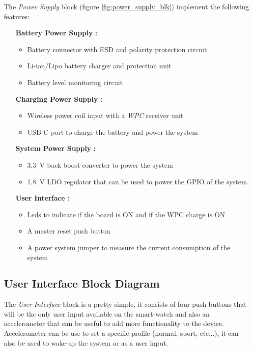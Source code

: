 \documentclass[report.tex]{subfiles}
\begin{document}
\begin{flushleft}
The \textit{Power Supply} block (figure \ref{fig:power_supply_blk}) implement the following features:
\end{flushleft}
\begin{itemize}
\item [\quad\textbf{Battery Power Supply}]\textbf{:}
\begin{itemize}
	\item Battery connector with ESD and polarity protection circuit
	\item Li-ion/Lipo battery charger and protection unit
	\item Battery level monitoring circuit
\end{itemize}
\item [\quad\textbf{Charging Power Supply}]\textbf{:}
\begin{itemize}
	\item Wireless power coil input with a \textit{WPC} receiver unit
	\item USB-C port to charge the battery and power the system
\end{itemize}
\item [\quad\textbf{System Power Supply}]\textbf{:}
\begin{itemize}
	\item \SI{+3.3}{\volt} buck boost converter to power the system
	\item \SI{+1.8}{\volt} LDO regulator that can be used to power the GPIO of the system
\end{itemize}
\item [\quad\textbf{User Interface}]\textbf{:}
\begin{itemize}
	\item Leds to indicate if the board is ON and if the WPC charge is ON
	\item A master reset push button
	\item A power system jumper to measure the current consumption of the system
\end{itemize}
\end{itemize}

\subsection{User Interface Block Diagram} \label{sec:usr_int_blk_dgr}
The \textit{User Interface} block is a pretty simple, it consists of four push-buttons that will be the only user input available on the smart-watch and also an accelerometer that can be useful to add more functionality to the device. Accelerometer can be use to set a specific profile (normal, sport, etc...), it can also be used to wake-up the system or as a user input.\\
\end{document}

